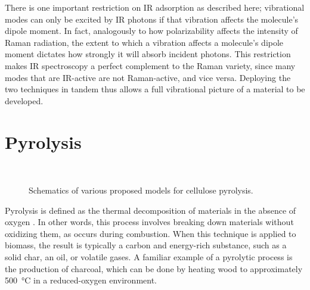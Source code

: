There is one important restriction on IR adsorption as described here; vibrational modes can only be excited by IR photons if that vibration affects the molecule's dipole moment. In fact, analogously to how polarizability affects the intensity of Raman radiation, the extent to which a vibration affects a molecule's dipole moment dictates how strongly it will absorb incident photons. This restriction makes IR spectroscopy a perfect complement to the Raman variety, since many modes that are IR-active are not Raman-active, and vice versa. Deploying the two techniques in tandem thus allows a full vibrational picture of a material to be developed.

\section{Pyrolysis}

\begin{figure}
	\centering
	\\
	\caption{Schematics of various proposed models for cellulose pyrolysis\cite{RefWorks:56}.}
	\label{fig:pyro_models}
\end{figure}

Pyrolysis is defined as the thermal decomposition of materials in the absence of oxygen \cite{RefWorks:56}. In other words, this process involves breaking down materials without oxidizing them, as occurs during combustion. When this technique is applied to biomass, the result is typically a carbon and energy-rich substance, such as a solid char, an oil, or volatile gases. A familiar example of a pyrolytic process is the production of charcoal, which can be done by heating wood to approximately \SI{500}{\celsius} in a reduced-oxygen environment.

